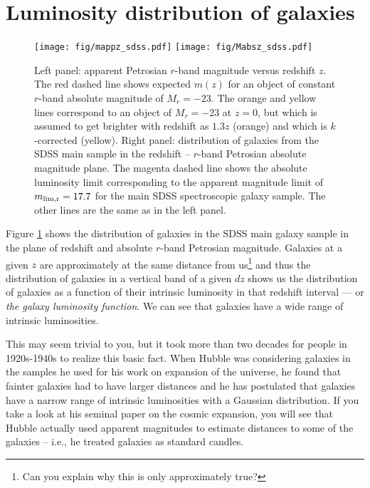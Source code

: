 \section{Luminosity distribution of galaxies}


\begin{figure}
\centerline{
\texttt{[image: fig/mappz\_sdss.pdf]}
\texttt{[image: fig/Mabsz\_sdss.pdf]}}
\caption{Left panel: apparent Petrosian $r$-band magnitude versus redshift $z$. The red dashed line shows expected $m(z)$ for an object of constant $r$-band absolute magnitude of $M_r=-23$. The orange and yellow lines correspond to an object of $M_r=-23$ at $z=0$, but which is assumed to get brighter with redshift as $1.3z$ (orange) and which is $k$-corrected (yellow). Right panel: distribution of galaxies from the SDSS main sample in the redshift -- $r$-band Petrosian absolute magnitude plane. The magenta dashed line shows the absolute luminosity limit corresponding to the apparent magnitude limit of $m_{\rm lim, r}=17.7$ for the main SDSS spectroscopic galaxy sample.  The other lines are the same as in the left panel. \label{fig:Mzsdss}}
\end{figure}

Figure \ref{fig:Mzsdss} shows the distribution of galaxies in the SDSS main galaxy sample in the plane of redshift and absolute $r$-band Petrosian magnitude. Galaxies at a given $z$ are approximately at the same distance from us\footnote{Can you explain why this is only approximately true?} and thus the distribution of galaxies in a vertical band of a given $dz$ shows us the distribution of galaxies as a function of their intrinsic luminosity in that redshift interval --- or {\it the galaxy luminosity function}. We can see that galaxies have a wide range of intrinsic luminosities.

This may seem trivial to you, but it took more than two decades for people in 1920s-1940s to realize this basic fact. When Hubble was considering galaxies in the samples he used for his work on expansion of the universe, he found that fainter galaxies had to have larger distances and he has postulated that galaxies have a narrow range of intrinsic luminosities with a Gaussian distribution. If you take a look at his seminal paper on the cosmic expansion, you will see that Hubble actually used apparent magnitudes to estimate distances to some of the galaxies -- i.e., he treated galaxies as standard candles. 

